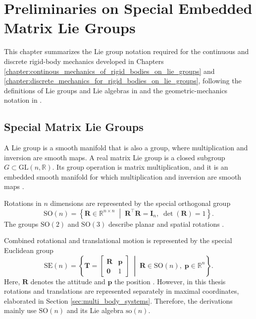 \chapter{Preliminaries on Special Embedded Matrix Lie Groups}
\label{chapter:preliminaries_lie_groups}

This chapter summarizes the Lie group notation required for the continuous 
and discrete rigid-body mechanics developed in Chapters \ref{chapter:continous_mechanics_of_rigid_bodies_on_lie_groups} and \ref{chapter:discrete_mechanics_for_rigid_bodies_on_lie_groups}, following the definitions of Lie groups and Lie algebras in \cite{Hall2000LieGroups} and the geometric-mechanics notation in \cite{Lee2008}.

\section{Special Matrix Lie Groups}
\label{sec:special_matrix_lie_groups}

A Lie group is a smooth manifold that is also a group, where multiplication and inversion are smooth maps. A real matrix Lie group is a closed subgroup
$G\subset\mathrm{GL}(n,\mathbb{R})$. Its group operation is matrix
multiplication, and it is an embedded smooth manifold for which
multiplication and inversion are smooth maps
\cite{Hall2000LieGroups}.

Rotations in \(n\) dimensions are represented by the special orthogonal group
\begin{equation}
    \mathrm{SO}(n)
    =
    \left\{
        \bm{R}\in\mathbb{R}^{n\times n}
        \;\middle|\;
        \bm{R}^{\top}\bm{R}=\bm{I}_{n},\;
        \det(\bm{R})=1
    \right\}.
    \label{eq:so_group}
\end{equation}
The groups \(\mathrm{SO}(2)\) and \(\mathrm{SO}(3)\) describe planar and spatial rotations \cite{Lee2008}.

Combined rotational and translational motion is represented by the special Euclidean group
\begin{equation}
    \mathrm{SE}(n)
    =
    \left\{
        \bm{T}
        =
        \begin{bmatrix}
            \bm{R} & \bm{p}\\
            \bm{0} & 1
        \end{bmatrix}
        \;\middle|\;
        \bm{R}\in\mathrm{SO}(n),\;
        \bm{p}\in\mathbb{R}^{n}
    \right\}.
    \label{eq:se_group}
\end{equation}
Here, \(\bm{R}\) denotes the attitude and \(\bm{p}\) the position \cite{Hall2000LieGroups}. However, in this thesis 
rotations and translations are represented separately
in maximal coordinates, elaborated in Section \ref{sec:multi_body_systems}. Therefore, the derivations mainly use
$\mathrm{SO}(n)$ and its Lie algebra $\mathrm{so}(n)$.

